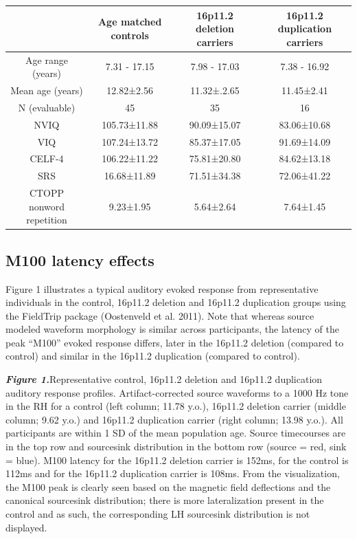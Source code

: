 \documentclass{article}
\begin{document}
\bigskip


\begin{tabular}{|c|c|c|c|}
\hline
 & Age matched controls	& 16p11.2 deletion carriers	& 16p11.2 duplication carriers\\
\hline
Age range (years) &	7.31 - 17.15	& 7.98 - 17.03 &	7.38 - 16.92\\
\hline
Mean age (years) &	12.82±2.56 &	11.32±.2.65 &	11.45±2.41\\
\hline
N (evaluable) &	45 &	35 &	16\\
\hline
NVIQ&	105.73±11.88 &	90.09±15.07 &	83.06±10.68\\
\hline
VIQ&	107.24±13.72 &	85.37±17.05 &	91.69±14.09\\
\hline
CELF-4&	106.22±11.22 &	75.81±20.80 &	84.62±13.18\\
\hline
SRS&	16.68±11.89 &	71.51±34.38 &	72.06±41.22\\
\hline
CTOPP nonword repetition &	9.23±1.95 &	5.64±2.64 &	7.64±1.45\\
\hline
\end{tabular}

\subsection{M100 latency effects}
Figure 1 illustrates a typical auditory evoked response from representative individuals in the control, 16p11.2 deletion and 16p11.2 duplication groups using the FieldTrip package (Oostenveld et al. 2011). Note that whereas source modeled waveform morphology is similar across participants, the latency of the peak “M100” evoked response differs, later in the 16p11.2 deletion (compared to control) and similar in the 16p11.2 duplication (compared to control).  

\bigskip

\textbf{\emph{Figure 1.}}Representative control, 16p11.2 deletion and 16p11.2 duplication auditory response profiles. Artifact-corrected source waveforms to a 1000 Hz tone in the RH for a control (left column; 11.78 y.o.), 16p11.2 deletion carrier (middle column; 9.62 y.o.) and 16p11.2 duplication carrier (right column; 13.98 y.o.). All participants are within 1 SD of the mean population age.  Source timecourses are in the top row and source\-sink distribution in the bottom row (source = red, sink = blue). M100 latency for the 16p11.2 deletion carrier is 152ms, for the control is 112ms and for the 16p11.2 duplication carrier is 108ms. From the visualization, the M100 peak is clearly seen based on the magnetic field deflections and the canonical source\-sink distribution; there is more lateralization present in the control and as such, the corresponding LH source\-sink distribution is not displayed.
\end{document}
